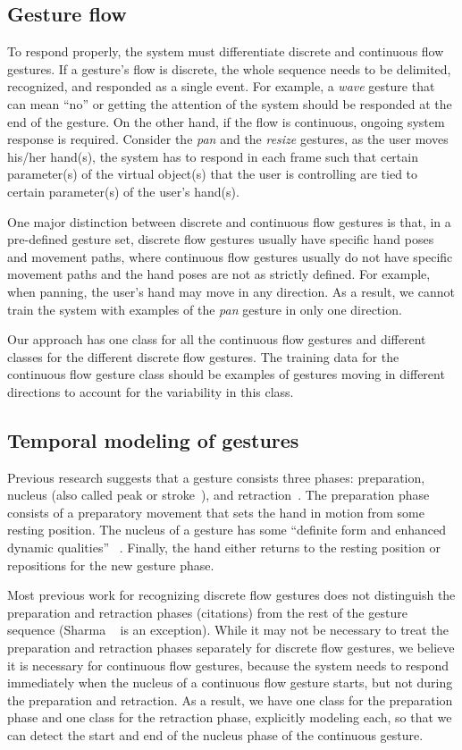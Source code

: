 \documentclass[10pt,twocolumn,letterpaper]{article}
\begin{document}
\subsection{Gesture flow}
To respond properly, the system must differentiate discrete and continuous
flow gestures. If a gesture's flow
is discrete, the whole sequence needs to be delimited, recognized, and responded
as a single event. For example, a \textit{wave} gesture that can mean ``no'' or getting the attention of the 
system should be responded at the end of the gesture. On the other hand, if the 
flow is continuous, ongoing system response is required. Consider the \textit{pan} and the \textit{resize} gestures, 
as the user moves his/her hand(s), the system has to respond in each frame such that
certain parameter(s) of the virtual object(s) that the user is controlling are tied to
certain parameter(s) of the user's hand(s).

One major distinction between discrete and continuous flow gestures is that,
in a pre-defined gesture set, discrete flow gestures usually have specific hand
poses and movement paths, where continuous flow gestures usually do not have
specific movement paths and the hand poses are not as strictly defined. For
example, when panning, the user's hand may move in any
direction. As a result, 
 we cannot train the system with examples of  the
\textit{pan} gesture in only one direction.

Our approach has
one class for all the continuous flow gestures and different classes for the different
discrete flow gestures. The training data for the continuous flow gesture class
should be examples of gestures moving in different directions to account for the 
variability in this class. 

\subsection{Temporal modeling of gestures}
Previous research suggests that
a gesture consists three phases: preparation, nucleus 
(also called peak or stroke~\cite{Mcneil82}), and retraction~\cite{Pavlovic97}. The preparation phase consists
of a preparatory movement that sets the hand in motion from some resting position.
The nucleus of a gesture has some ``definite form and enhanced dynamic qualities''
~\cite{kendon86}. Finally, the hand either returns to the resting position or repositions
for the new gesture phase. 

Most previous work for recognizing discrete flow gestures does not
distinguish the preparation and retraction phases (citations) from the rest of the gesture
sequence (Sharma \etal~\cite{sharma00} is an exception). While it may not be necessary to treat the preparation
and retraction phases separately for discrete flow gestures, we believe it is 
necessary for continuous flow gestures, because
the system needs to respond immediately when the nucleus of a continuous flow
gesture starts, but not during the preparation and retraction. As a result, we have one class for the preparation phase and one class for the 
retraction phase, explicitly modeling each, so that we can detect
the start and end of the nucleus phase of the continuous gesture. 
\end{document}
